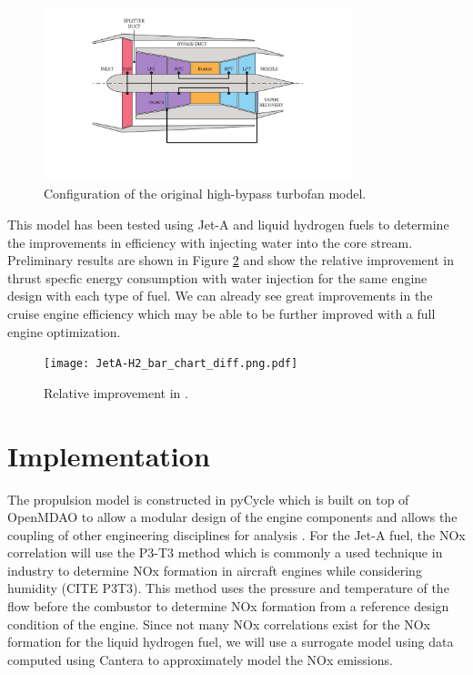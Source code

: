 \documentclass[conf]{new-aiaa}
\begin{document}
\begin{figure}[H]
	\centering
	\includegraphics[width=0.8\textwidth]{turbofan_wvr.pdf}
	\caption{Configuration of the original high-bypass turbofan model.}
	\label{fig:hbtf_cycle}
\end{figure}

This model has been tested using Jet-A and liquid hydrogen fuels to determine the improvements in efficiency with injecting water into the core stream.
Preliminary results are shown in Figure \ref{fig:results} and show the relative improvement in thrust specfic energy consumption with water injection for the same engine design with each type of fuel.
We can already see great improvements in the cruise engine efficiency which may be able to be further improved with a full engine optimization.

\begin{figure}[H]
	\centering
	\texttt{[image: JetA-H2\_bar\_chart\_diff.png.pdf]}
	\caption{Relative improvement in .}
	\label{fig:results}
\end{figure}

\section{Implementation}
\label{sec:imp}
The propulsion model is constructed in pyCycle which is built on top of OpenMDAO to allow a modular design of the engine components and allows the coupling of other engineering disciplines for analysis \cite{Gray2019a}.
For the Jet-A fuel, the NOx correlation will use the P3-T3 method which is commonly a used technique in industry to determine NOx formation in aircraft engines while considering humidity (CITE P3T3).
This method uses the pressure and temperature of the flow before the combustor to determine NOx formation from a reference design condition of the engine.
Since not many NOx correlations exist for the NOx formation for the liquid hydrogen fuel, we will use a surrogate model using data computed using Cantera to approximately model the NOx emissions.
\end{document}
